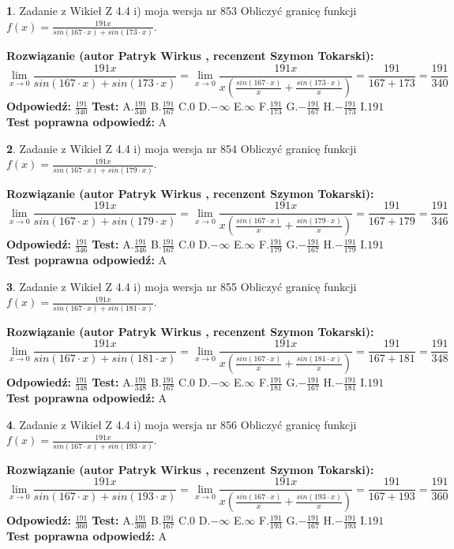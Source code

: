 \documentclass[12pt, a4paper]{article}
\theoremstyle{definition} %
\newtheorem{zad}{}
\newcommand{\zadStart}[1]{\begin{zad}#1\newline}
\newcommand{\zadStop}{\end{zad}}
\newcommand{\rozwStart}[2]{\noindent \textbf{Rozwiązanie (autor #1 , recenzent #2): }\newline}
\newcommand{\rozwStop}{\newline}
\newcommand{\odpStart}{\noindent \textbf{Odpowiedź:}\newline}
\newcommand{\odpStop}{\newline}
\newcommand{\testStart}{\noindent \textbf{Test:}\newline}
\newcommand{\testStop}{\newline}
\newcommand{\kluczStart}{\noindent \textbf{Test poprawna odpowiedź:}\newline}
\newcommand{\kluczStop}{\newline}
\begin{document}
\zadStart{Zadanie z Wikieł Z 4.4 i) moja wersja nr 853}
Obliczyć granicę funkcji $f(x)=\frac{191x}{sin(167\cdot x) +sin(173\cdot x)}$.
\zadStop
\rozwStart{Patryk Wirkus}{Szymon Tokarski}
$$\lim\limits_{x\to 0}\frac{191x}{sin(167\cdot x) +sin(173\cdot x)}=\lim\limits_{x\to 0}\frac{191x}{x(\frac{sin(167\cdot x)}{x}+\frac{sin(173\cdot x)}{x})}=\frac{191}{167+173} = \frac{191}{340}$$
\rozwStop
\odpStart
$\frac{191}{340}$
\odpStop
\testStart
A.$\frac{191}{340}$
B.$\frac{191}{167}$
C.$0$
D.$-\infty$
E.$\infty$
F.$\frac{191}{173}$
G.$-\frac{191}{167}$
H.$-\frac{191}{173}$
I.$191$
\testStop
\kluczStart
A
\kluczStop



\zadStart{Zadanie z Wikieł Z 4.4 i) moja wersja nr 854}
Obliczyć granicę funkcji $f(x)=\frac{191x}{sin(167\cdot x) +sin(179\cdot x)}$.
\zadStop
\rozwStart{Patryk Wirkus}{Szymon Tokarski}
$$\lim\limits_{x\to 0}\frac{191x}{sin(167\cdot x) +sin(179\cdot x)}=\lim\limits_{x\to 0}\frac{191x}{x(\frac{sin(167\cdot x)}{x}+\frac{sin(179\cdot x)}{x})}=\frac{191}{167+179} = \frac{191}{346}$$
\rozwStop
\odpStart
$\frac{191}{346}$
\odpStop
\testStart
A.$\frac{191}{346}$
B.$\frac{191}{167}$
C.$0$
D.$-\infty$
E.$\infty$
F.$\frac{191}{179}$
G.$-\frac{191}{167}$
H.$-\frac{191}{179}$
I.$191$
\testStop
\kluczStart
A
\kluczStop



\zadStart{Zadanie z Wikieł Z 4.4 i) moja wersja nr 855}
Obliczyć granicę funkcji $f(x)=\frac{191x}{sin(167\cdot x) +sin(181\cdot x)}$.
\zadStop
\rozwStart{Patryk Wirkus}{Szymon Tokarski}
$$\lim\limits_{x\to 0}\frac{191x}{sin(167\cdot x) +sin(181\cdot x)}=\lim\limits_{x\to 0}\frac{191x}{x(\frac{sin(167\cdot x)}{x}+\frac{sin(181\cdot x)}{x})}=\frac{191}{167+181} = \frac{191}{348}$$
\rozwStop
\odpStart
$\frac{191}{348}$
\odpStop
\testStart
A.$\frac{191}{348}$
B.$\frac{191}{167}$
C.$0$
D.$-\infty$
E.$\infty$
F.$\frac{191}{181}$
G.$-\frac{191}{167}$
H.$-\frac{191}{181}$
I.$191$
\testStop
\kluczStart
A
\kluczStop



\zadStart{Zadanie z Wikieł Z 4.4 i) moja wersja nr 856}
Obliczyć granicę funkcji $f(x)=\frac{191x}{sin(167\cdot x) +sin(193\cdot x)}$.
\zadStop
\rozwStart{Patryk Wirkus}{Szymon Tokarski}
$$\lim\limits_{x\to 0}\frac{191x}{sin(167\cdot x) +sin(193\cdot x)}=\lim\limits_{x\to 0}\frac{191x}{x(\frac{sin(167\cdot x)}{x}+\frac{sin(193\cdot x)}{x})}=\frac{191}{167+193} = \frac{191}{360}$$
\rozwStop
\odpStart
$\frac{191}{360}$
\odpStop
\testStart
A.$\frac{191}{360}$
B.$\frac{191}{167}$
C.$0$
D.$-\infty$
E.$\infty$
F.$\frac{191}{193}$
G.$-\frac{191}{167}$
H.$-\frac{191}{193}$
I.$191$
\testStop
\kluczStart
A
\kluczStop
\end{document}
